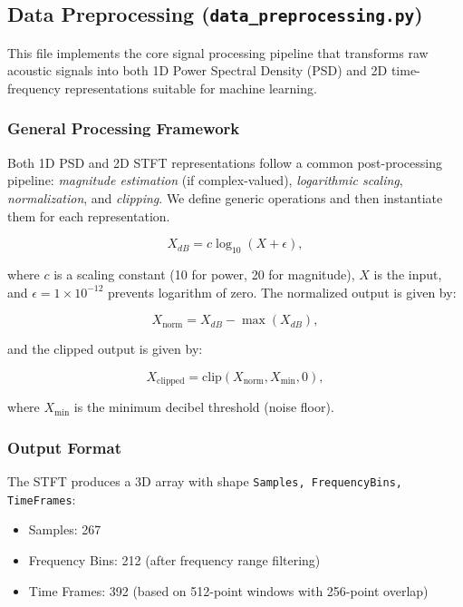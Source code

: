 \subsection{Data Preprocessing (\texttt{data\_preprocessing.py})}

This file implements the core signal processing pipeline that transforms raw acoustic signals into 
both 1D Power Spectral Density (PSD) and 2D time-frequency representations suitable for machine learning.

\subsubsection{General Processing Framework}
Both 1D PSD and 2D STFT representations follow a common post-processing pipeline: \textit{magnitude estimation} 
(if complex-valued), \textit{logarithmic scaling}, \textit{normalization}, and \textit{clipping}. 
We define generic operations and then instantiate them for each representation.

\begin{equation}\label{log_scale}
    X_{dB} = c \log_{10}(X + \epsilon),
\end{equation}

where $c$ is a scaling constant (10 for power, 20 for magnitude), $X$ is the input, and $\epsilon = 1 \times 10^{-12}$ 
prevents logarithm of zero. The normalized output is given by:

\begin{equation}\label{normalize}
    X_{\text{norm}} = X_{dB} - \max(X_{dB}),
\end{equation}

and the clipped output is given by: 

\begin{equation}\label{clip}
    X_{\text{clipped}} = \text{clip}(X_{\text{norm}}, X_{\min}, 0),
\end{equation}

where $X_{\min}$ is the minimum decibel threshold (noise floor). \\

\subsubsection{Output Format}
The STFT produces a 3D array with shape \verb|Samples, FrequencyBins, TimeFrames|:

\begin{itemize}
    \item Samples: 267
    \item Frequency Bins: 212 (after frequency range filtering)
    \item Time Frames: 392 (based on 512-point windows with 256-point overlap)
\end{itemize}

